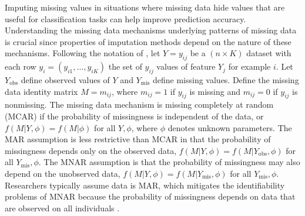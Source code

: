 \documentclass[10pt]{book}
\theoremstyle{definition}
\begin{document}
Imputing missing values in situations where missing data hide values that are useful for classification tasks can help improve prediction accuracy. Understanding the missing data mechanisms underlying patterns of missing data is crucial since properties of imputation methods depend on the nature of these mechanisms. Following the notation of \citet[Chap.~1]{little2014}, let $Y = y_{ij}$ be a $(n \times K)$ dataset with each row $y_i = (y_{i1}, \ldots, y_{iK})$ the set of $y_{ij}$ values of feature $Y_j$ for example $i$. Let $Y_{\mathrm{obs}}$ define observed values of $Y$ and $Y_{\mathrm{mis}}$ define missing values. Define the missing data identity matrix $M = m_{ij}$, where $m_{ij} = 1$ if $y_{ij}$ is missing and $m_{ij} = 0$ if $y_{ij}$ is nonmissing. The missing data mechanism is missing completely at random (MCAR) if the probability of missingness is independent of the data, or $f(M | Y, \phi) = f(M | \phi)$ for all $Y, \phi$, where $\phi$ denotes unknown parameters. The MAR assumption is less restrictive than MCAR in that the probability of missingness depends only on the observed data, $f(M | Y, \phi) = f(M | Y_{\mathrm{obs}}, \phi)$ for all $Y_{\mathrm{mis}}, \phi$. The MNAR assumption is that the probability of missingness may also depend on the unobserved data, $f(M | Y, \phi) = f(M | Y_{\mathrm{mis}}, \phi)$ for all $Y_{\mathrm{mis}}, \phi$. Researchers typically assume data is MAR, which mitigates the identifiability problems of MNAR because the probability of missingness depends on data that are observed on all individuals \citep[Chap.~6]{tsiatis2007}. 

\par			
{} \label{section:techniques} 
\end{document}
